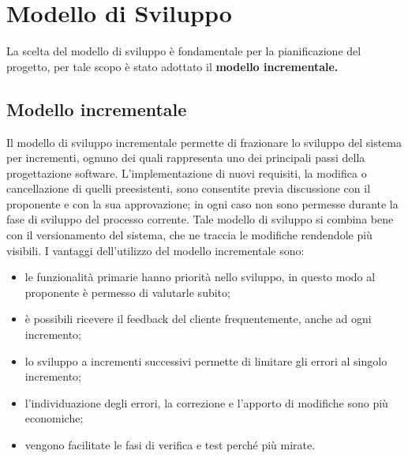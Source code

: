 \section{Modello di Sviluppo}
La scelta del modello di sviluppo è fondamentale per la pianificazione del progetto, per tale scopo è stato adottato il \textbf{modello incrementale.}

\subsection{Modello incrementale}
Il modello di sviluppo incrementale permette di frazionare lo sviluppo del sistema per incrementi, ognuno dei quali rappresenta uno dei principali passi della progettazione software.
L'implementazione di nuovi requisiti, la modifica o cancellazione di quelli preesistenti, sono consentite previa discussione con il proponente e con la sua approvazione; in ogni caso non sono permesse durante la fase di sviluppo del processo corrente.
Tale modello di sviluppo si combina bene con il versionamento del sistema, che ne traccia le modifiche rendendole più visibili.
I vantaggi dell'utilizzo del modello incrementale sono:
\begin{itemize}
    \item le funzionalità primarie hanno priorità nello sviluppo, in questo modo al proponente è permesso di valutarle subito;
    \item è possibili ricevere il feedback del cliente frequentemente, anche ad ogni incremento;
    \item lo sviluppo a incrementi successivi permette di limitare gli errori al singolo incremento;
    \item l'individuazione degli errori, la correzione e l'apporto di modifiche sono più economiche;
    \item vengono facilitate le fasi di verifica e test perché più mirate.
\end{itemize} 